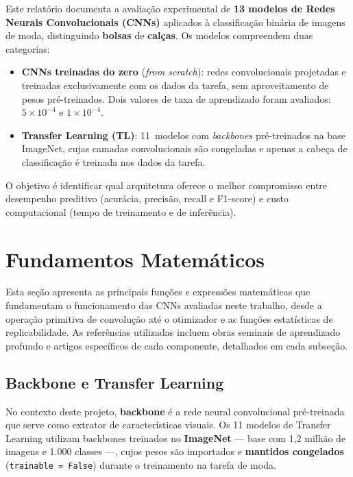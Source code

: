 \documentclass[12pt,a4paper]{article}
\begin{document}
Este relatório documenta a avaliação experimental de \textbf{13 modelos de Redes Neurais
Convolucionais (CNNs)} aplicados à classificação binária de imagens de moda, distinguindo
\textbf{bolsas} de \textbf{calças}. Os modelos compreendem duas categorias:

\begin{itemize}
  \item \textbf{CNNs treinadas do zero} (\emph{from scratch}): redes convolucionais projetadas
        e treinadas exclusivamente com os dados da tarefa, sem aproveitamento de pesos pré-treinados.
        Dois valores de taxa de aprendizado foram avaliados: $5\times10^{-4}$ e $1\times10^{-4}$.
  \item \textbf{Transfer Learning (TL)}: 11~modelos com \emph{backbones} pré-treinados na
        base ImageNet, cujas camadas convolucionais são congeladas e apenas a cabeça de
        classificação é treinada nos dados da tarefa.
\end{itemize}

O objetivo é identificar qual arquitetura oferece o melhor compromisso entre desempenho
preditivo (acurácia, precisão, recall e F1-score) e custo computacional (tempo de treinamento
e de inferência).

\section{Fundamentos Matemáticos}
\label{sec:fundamentos}

Esta seção apresenta as principais funções e expressões matemáticas que fundamentam
o funcionamento das CNNs avaliadas neste trabalho, desde a operação primitiva de
convolução até o otimizador e as funções estatísticas de replicabilidade.
As referências utilizadas incluem obras seminais de aprendizado profundo
\cite{lecun1998gradient,goodfellow2016deep,lecun2015deep} e artigos específicos
de cada componente, detalhados em cada subseção.

\subsection{Backbone e Transfer Learning}
\label{sec:backbone}

No contexto deste projeto, \textbf{backbone} é a rede neural convolucional
pré-treinada que serve como extrator de características visuais. Os 11 modelos
de Transfer Learning utilizam backbones treinados no \textbf{ImageNet}
\cite{deng2009imagenet} --- base com 1,2 milhão de imagens e 1.000 classes ---,
cujos pesos são importados e \textbf{mantidos congelados}
(\texttt{trainable = False}) durante o treinamento na tarefa de moda.
\end{document}
